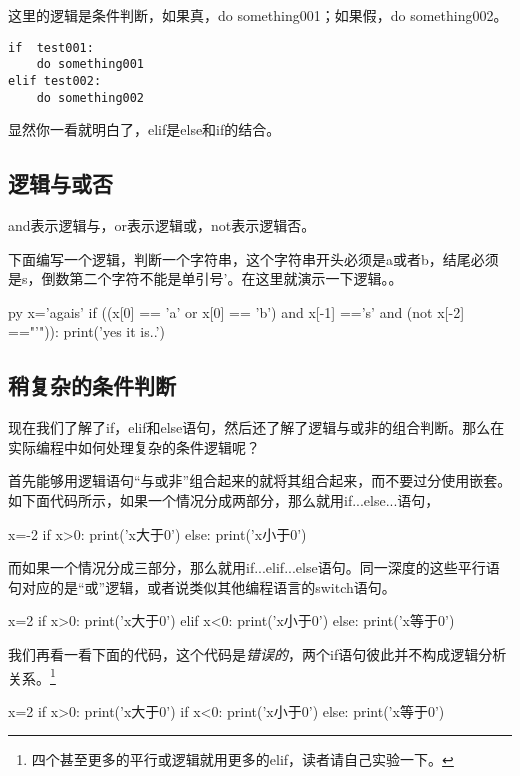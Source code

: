 \documentclass[12pt,oneside]{book}
\begin{document}
\begin{common-format}
这里的逻辑是条件判断，如果真，do something001；如果假，do something002。

\begin{Verbatim}
if  test001:
    do something001
elif test002:
    do something002
\end{Verbatim}

显然你一看就明白了，elif是else和if的结合。


\subsection{逻辑与或否}
and表示逻辑与，or表示逻辑或，not表示逻辑否。

下面编写一个逻辑，判断一个字符串，这个字符串开头必须是a或者b，结尾必须是s，倒数第二个字符不能是单引号'。在这里就演示一下逻辑。。
\begin{xverbatim}[129]{py}
x='agais'
if ((x[0] == 'a' or x[0] == 'b')
    and x[-1] =='s'
    and (not x[-2] =="'")):
    print('yes it is..')
\end{xverbatim}



\subsection{稍复杂的条件判断}
现在我们了解了if，elif和else语句，然后还了解了逻辑与或非的组合判断。那么在实际编程中如何处理复杂的条件逻辑呢？

首先能够用逻辑语句“与或非”组合起来的就将其组合起来，而不要过分使用嵌套。如下面代码所示，如果一个情况分成两部分，那么就用if...else...语句，
\begin{tcbpython}[]
x=-2
if x>0:
    print('x大于0')
else:
    print('x小于0')
\end{tcbpython}

而如果一个情况分成三部分，那么就用if...elif...else语句。同一深度的这些平行语句对应的是“或”逻辑，或者说类似其他编程语言的switch语句。
\begin{tcbpython}
x=2
if x>0:
    print('x大于0')
elif x<0:
    print('x小于0')
else:
    print('x等于0')
\end{tcbpython}

我们再看一看下面的代码，这个代码是\emph{错误的}，两个if语句彼此并不构成逻辑分析关系。\footnote{四个甚至更多的平行或逻辑就用更多的elif，读者请自己实验一下。}
\begin{tcbpython}
x=2
if x>0:
    print('x大于0')
if x<0:
    print('x小于0')
else:
    print('x等于0')
\end{tcbpython}



\end{common-format}
\end{document}

